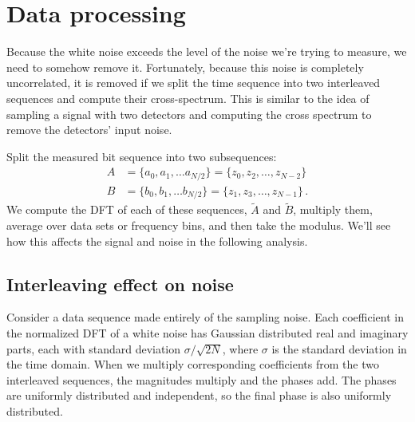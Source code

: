 \documentclass[twocolumn]{article}
\begin{document}
\section{Data processing}

Because the white noise exceeds the level of the noise we're trying to measure, we need to somehow remove it.
Fortunately, because this noise is completely uncorrelated, it is removed if we split the time sequence into two interleaved sequences and compute their cross-spectrum.
This is similar to the idea of sampling a signal with two detectors and computing the cross spectrum to remove the detectors' input noise.

Split the measured bit sequence into two subsequences:
\begin{align}
A &= \{ a_0, a_1, \ldots a_{N/2} \} = \{z_0, z_2, \ldots, z_{N-2} \} \nonumber \\
B &= \{ b_0, b_1, \ldots b_{N/2} \} = \{z_1, z_3, \ldots, z_{N-1} \} \, .
\end{align}
We compute the DFT of each of these sequences, $\tilde{A}$ and $\tilde{B}$, multiply them, average over data sets or frequency bins, and then take the modulus.
We'll see how this affects the signal and noise in the following analysis.

\subsection{Interleaving effect on noise}

Consider a data sequence made entirely of the sampling noise.
Each coefficient in the normalized DFT of a white noise has Gaussian distributed real and imaginary parts, each with standard deviation $\sigma / \sqrt{2N}$, where $\sigma$ is the standard deviation in the time domain.
When we multiply corresponding coefficients from the two interleaved sequences, the magnitudes multiply and the phases add.
The phases are uniformly distributed and independent, so the final phase is also uniformly distributed.
\end{document}
